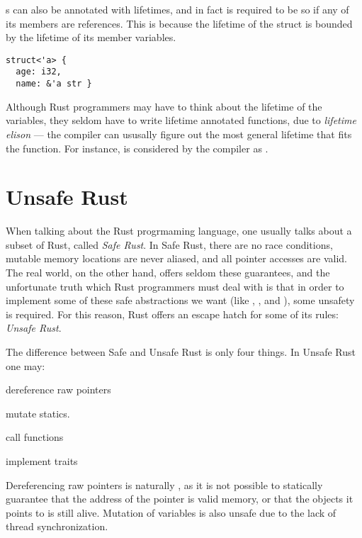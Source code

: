 s can also be annotated with lifetimes, and in fact is required to be so if any of its
members are references. This is because the lifetime of the struct is bounded by the lifetime of
its member variables.
\begin{lstlisting}
struct<'a> {
  age: i32,
  name: &'a str }
\end{lstlisting}

Although Rust programmers may have to think about the lifetime of the variables, they seldom have
to write lifetime annotated functions, due to \emph{lifetime elison} --- the compiler can ususally
figure out the most general lifetime that fits the function. For instance,  is considered by the compiler as .




\section{Unsafe Rust}

When talking about the Rust progrmaming language, one usually talks about a subset of Rust, called
\emph{Safe Rust}. In Safe Rust, there are no race conditions, mutable memory locations are never
aliased, and all pointer accesses are valid.  The real world, on the other hand, offers seldom
these guarantees, and the unfortunate truth which Rust programmers must deal with is that in order
to implement some of these safe abstractions we want (like , , and
), some unsafety is required.  For this reason, Rust offers an escape hatch for some of
its rules: \emph{Unsafe Rust}.

The difference between Safe and Unsafe Rust is only four things. In Unsafe Rust one may:
\begin{enumerate*}[1) ]
    \item dereference raw pointers
    \item mutate statics.
    \item call  functions
    \item implement  traits
\end{enumerate*}

Dereferencing raw pointers is naturally , as it is not possible to statically
guarantee that the address of the pointer is valid memory, or that the objects it points to is
still alive. Mutation of   variables is also unsafe due to the lack of thread
synchronization.

